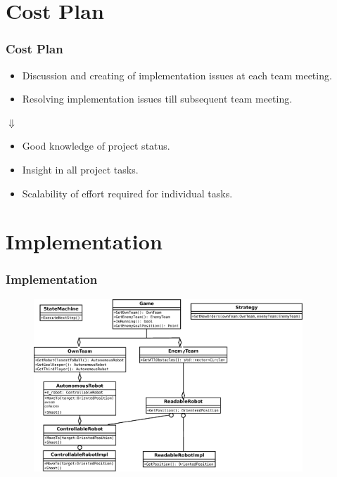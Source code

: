 \documentclass[hyperref={pdfpagelabels=false}]{beamer}
\begin{document}
\section{Cost Plan} 
\begin{frame}
	\frametitle{Cost Plan} 
	\begin{itemize}
		\item Discussion and creating of implementation issues at each team meeting.
		\item Resolving implementation issues till subsequent team meeting.
	\end{itemize}
	\begin{center}
	\LARGE$\Downarrow$
	\end{center}		
	
	\begin{itemize}
		\item Good knowledge of project status.
		\item Insight in all project tasks.
		\item Scalability of effort required for individual tasks.
	\end{itemize}
\end{frame}

\section{Implementation} 
\begin{frame}
	\frametitle{Implementation}
	\begin{figure}
	\centering
	\includegraphics[width = 0.9\textwidth]{architecture}
	\end{figure}
\end{frame}
\end{document}
